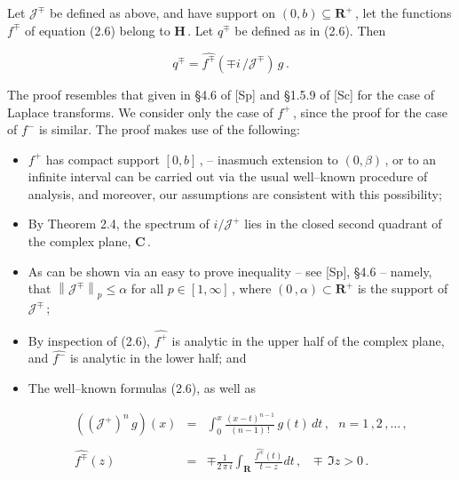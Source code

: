 \documentclass[10pt,a4paper]{amsart}
\begin{document}
  \begin{Theorem}%
    \label{theorem:2.5}
Let ${\mathcal J}^\mp$ be defined as above, and have support on $(0,b)
\subseteq {\mathbf R}^+$\,, let the functions $f^\mp$ of equation
(2.6) belong to ${\mathbf H}$\,.  Let $q^\mp$ be defined as in
(2.6).  Then
 
 \begin{equation}%
 q^\mp = \widehat{f^\mp}\left(\mp i\,/{\mathcal J}^\mp\right)\,g\,.
\label{equation:2.10}
 \end{equation}

 \end{Theorem}

 \begin{Proof} The proof resembles that given in \S 4.6 of [Sp] and
   \S1.5.9 of [Sc] for the case of Laplace transforms. We consider
   only the case of $f^+$\,, since the proof for the case of $f^-$ is
   similar.     The proof makes use of the following:
 \begin{itemize}
   \item $f^+$ has compact support $[0,b]$\,, -- inasmuch
       extension to $(0,\beta)$\,, or to an infinite interval can be
       carried out via the usual well--known procedure of analysis,
       and moreover, our assumptions are consistent with this possibility;
   \item By Theorem 2.4, the spectrum of $i/{\mathcal J}^+$ lies in
     the closed second quadrant of the complex plane, ${\mathbf C}$\,.
   \item As can be shown via an easy to prove inequality -- see
       [Sp], \S4.6 -- namely, that $\left\|{\mathcal
         J}^\mp\right\|_p \leq \alpha$ for all $p \in [1,\infty]$\,,
       where $(0\,,\alpha) \subset {\mathbf R}^+$ is the support of
       ${\mathcal J}^\mp$\,;
   \item By inspection of (2.6), $\widehat{f^+}$ is
     analytic in the upper half of the complex plane, and
      $\widehat{f^-}$ is analytic in the lower half; and
   \item The well--known formulas (2.6), as well as  

   \begin{equation} %
     \begin{array}{rcl}
          \displaystyle \left(\left({\mathcal J}^+\right)^n\,g\right)(x) & = & 
          \displaystyle \int_0^x 
          \frac{(x-t)^{n-1}}{(n-1)\,!} \, g(t) \, dt\,, \ \ \ n =
          1\,,2\,,\ldots\,,\\ 
           \\
          \widehat{f^\mp}(z)  & = & \displaystyle \mp
          \frac{1}{2\,\pi\,i} \int_{\mathbf R} 
          \frac{\widehat{f^\mp}(t)}{t - z} dt\,, \ \ \ \mp\,\Im z > 0\,.
     \end{array}
    \label{equation:2.11}
   \end{equation}
   

\end{itemize}
\end{Proof}
\end{document}
